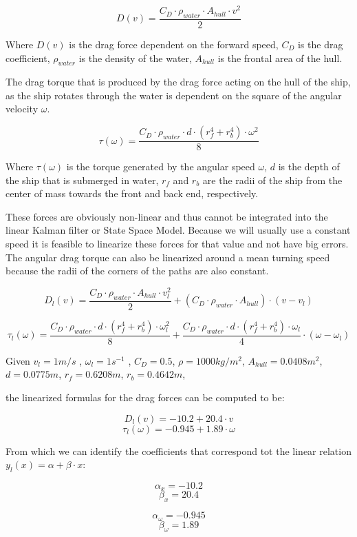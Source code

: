\[ D(v) = \frac{C_{D}\cdot\rho_{water}\cdot A_{hull}\cdot v^{2}}{2} \]

Where $D(v)$ is the drag force dependent on the forward speed, $C_{D}$ is the drag coefficient, $\rho_{water}$ is the density of the water, $A_{hull}$ is the frontal area of the hull. 

The drag torque that is produced by the drag force acting on the hull of the ship, as the ship rotates through the water is dependent on the square of the angular velocity $ \omega $.

\[ \tau(\omega) = \frac{C_{D} \cdot \rho_{water} \cdot d \cdot (r_{f}^{4} + r_{b}^{4}) \cdot \omega^{2}}{8} \]

Where $ \tau(\omega) $ is the torque generated by the angular speed $ \omega $, $ d  $ is the depth of the ship that is submerged in water, $ r_{f} $ and $ r_{b} $ are the radii of the ship from the center of mass towards the front and back end, respectively.

These forces are obviously non-linear and thus cannot be integrated into the linear Kalman filter or State Space Model. Because we will usually use a constant speed it is feasible to linearize these forces for that value and not have big errors. The angular drag torque can also be linearized around a mean turning speed because the radii of the corners of the paths are also constant.

\[ D_{l}(v) = \frac{C_{D}\cdot\rho_{water}\cdot A_{hull}\cdot v_{l}^{2}}{2} + (C_{D}\cdot\rho_{water}\cdot A_{hull})\cdot (v-v_{l}) \]

\[ \tau_{l}(\omega) = \frac{C_{D} \cdot \rho_{water} \cdot d \cdot (r_{f}^{4} + r_{b}^{4}) \cdot \omega_{l}^{2}}{8} + \frac{C_{D} \cdot \rho_{water} \cdot d \cdot (r_{f}^{4} + r_{b}^{4}) \cdot \omega_{l}}{4} \cdot (\omega - \omega_{l}) \] 

Given 
 $ v_{l} = 1m/s $ ,
 $ \omega_{l} = 1 s ^{-1} $ ,
 $ C_{D} = 0.5 $,
 $ \rho = 1000 kg/m ^{2} $,
 $ A_{hull} = 0.0408 m^{2} $,
 $ d = 0.0775 m $,
 $ r_{f} = 0.6208 m $,
 $ r_{b} = 0.4642 m $,
 
the linearized formulas for the drag forces can be computed to be:

\[ D_{l}(v) = -10.2 + 20.4 \cdot v \]
\[ \tau_{l}(\omega) = -0.945 + 1.89 \cdot \omega \]

From which we can identify the coefficients that correspond tot the linear relation $ y_{l}(x) = \alpha + \beta \cdot x $:\\
\begin{minipage}{0.35\linewidth}	
\[ \alpha_{x} = -10.2 \] 
\[ \beta_{x} = 20.4 \]
\end{minipage}
\begin{minipage}{0.35\linewidth}
\[ \alpha_{\omega} = -0.945 \]
\[ \beta_{\omega} = 1.89 \]
\end{minipage}


